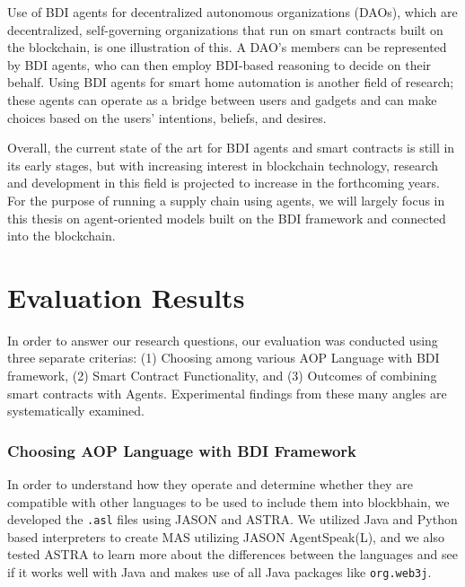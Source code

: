\vspace{.5cm}
Use of \ac{BDI} agents for decentralized autonomous organizations (DAOs), which are decentralized, self-governing organizations that run on smart contracts built on the blockchain, is one illustration of this. A DAO's members can be represented by \ac{BDI} agents, who can then employ \ac{BDI}-based reasoning to decide on their behalf. Using \ac{BDI} agents for smart home automation is another field of research; these agents can operate as a bridge between users and gadgets and can make choices based on the users' intentions, beliefs, and desires.

\vspace{.5cm}

Overall, the current state of the art for \ac{BDI} agents and smart contracts is still in its early stages, but with increasing interest in blockchain technology, research and development in this field is projected to increase in the forthcoming years. For the purpose of running a supply chain using agents, we will largely focus in this thesis on agent-oriented models built on the \ac{BDI} framework and connected into the blockchain.

\section{Evaluation Results}

In order to answer our research questions, our evaluation was conducted using three separate criterias: (1) Choosing among various \ac{AOP} Language with \ac{BDI} framework, (2) Smart Contract Functionality, and (3) Outcomes of combining smart contracts with Agents. Experimental findings from these many angles are systematically examined.

\subsubsection{Choosing \ac{AOP} Language with \ac{BDI} Framework}

  In order to understand how they operate and determine whether they are compatible with other languages to be used to include them into blockbhain, we developed the \texttt{.asl} files using JASON and \ac{ASTRA}. We utilized Java and Python based interpreters to create \ac{MAS} utilizing JASON AgentSpeak(L), and we also tested \ac{ASTRA} to learn more about the differences between the languages and see if it works well with Java and makes use of all Java packages like \texttt{org.web3j}. 

